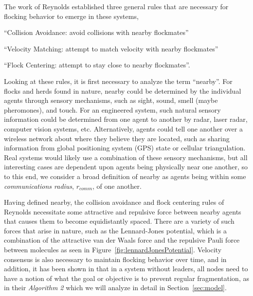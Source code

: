 \documentclass[10pt, conference, compsocconf]{IEEEtran}
\begin{document}
The work of Reynolds \cite{Reynolds1987} established three general rules that are necessary for flocking behavior to emerge in these systems, \begin{inparaenum}[\itshape 1\upshape)]\item ``Collision Avoidance: avoid collisions with nearby flockmates'' \item ``Velocity Matching: attempt to match velocity with nearby flockmates'' \item ``Flock Centering: attempt to stay close to nearby flockmates''. \end{inparaenum}
%
Looking at these rules, it is first necessary to analyze the term ``nearby''.  For flocks and herds found in nature, nearby could be determined by the individual agents through sensory mechanisms, such as sight, sound, smell (maybe pheromones), and touch.
%
For an engineered system, such natural sensory information could be determined from one agent to another by radar, laser radar, computer vision systems, etc.
%
Alternatively, agents could tell one another over a wireless network about where they believe they are located, such as sharing information from global positioning system (GPS) state or cellular triangulation.
%
Real systems would likely use a combination of these sensory mechanisms, but all interesting cases are dependent upon agents being physically near one another, so to this end, we consider a broad definition of nearby as agents being within some \textit{communications radius}, $r_{comm}$, of one another.

Having defined nearby, the collision avoidance and flock centering rules of Reynolds necessitate some attractive and repulsive force between nearby agents that causes them to become equidistantly spaced.
%
There are a variety of such forces that arise in nature, such as the Lennard-Jones potential, which is a combination of the attractive van der Waals force and the repulsive Pauli force between molecules \cite{Jones1924} as seen in Figure~\ref{fig:lennardJonesPotential}.
%
Velocity consensus is also necessary to maintain flocking behavior over time, and in addition, it has been shown in \cite{os2006} that in a system without leaders, all nodes need to have a notion of what the goal or objective is to prevent regular fragmentation, as in their \textit{Algorithm 2} which we will analyze in detail in Section~\ref{sec:model}.
\end{document}
